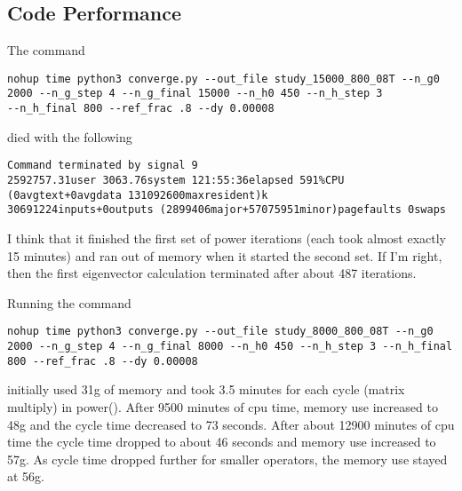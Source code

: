\documentclass[]{article}
\begin{document}
\subsection{Code Performance}
\label{sec:code}

The command
\begin{verbatim}
nohup time python3 converge.py --out_file study_15000_800_08T --n_g0
2000 --n_g_step 4 --n_g_final 15000 --n_h0 450 --n_h_step 3
--n_h_final 800 --ref_frac .8 --dy 0.00008
\end{verbatim}
died with the following
\begin{verbatim}
Command terminated by signal 9
2592757.31user 3063.76system 121:55:36elapsed 591%CPU (0avgtext+0avgdata 131092600maxresident)k
30691224inputs+0outputs (2899406major+57075951minor)pagefaults 0swaps
\end{verbatim}
I think that it finished the first set of power iterations (each took
almost exactly 15 minutes) and ran out of memory when it started the
second set.  If I'm right, then the first eigenvector calculation
terminated after about 487 iterations.

Running the command
\begin{verbatim}
nohup time python3 converge.py --out_file study_8000_800_08T --n_g0 2000 --n_g_step 4 --n_g_final 8000 --n_h0 450 --n_h_step 3 --n_h_final 800 --ref_frac .8 --dy 0.00008 
\end{verbatim}
initially used 31g of memory and took 3.5 minutes for each cycle
(matrix multiply) in power().  After 9500 minutes of cpu time, memory
use increased to 48g and the cycle time decreased to 73 seconds.
After about 12900 minutes of cpu time the cycle time dropped to about
46 seconds and memory use increased to 57g.  As cycle time dropped
further for smaller operators, the memory use stayed at 56g.
\end{document}
